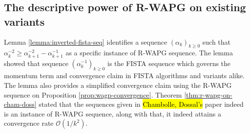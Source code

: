 \documentclass[12pt]{article}
\begin{document}
    \subsection{The descriptive power of R-WAPG on existing variants}\label{ssec:describe-variants-with-rwapg}
        Lemma \ref{lemma:inverted-fista-seq} identifies a sequence $(\alpha_k)_{k \ge 0}$ such that $\alpha_k^{-2} \ge \alpha_{k + 1}^{-2} - \alpha_{k + 1}^{-1}$ as a specific instance of R-WAPG sequence. 
        The lemma showed that sequence $(\alpha_k^{-1})_{k \ge 0}$ is the FISTA sequence which governs the momentum term and convergence claim in FISTA algorithms and variants alike. 
        The lemma also provides a simplified convergence claim using the R-WAPG sequence on Proposition \ref{prop:wagp-convergence}. 
        Theorem \ref{thm:r-wapg-on-cham-doss} stated that the sequences given in  
        {\hl{Chambolle, Dossal's}}
        paper \cite{chambolle_convergence_2015} indeed is an instance of R-WAPG sequence, along with that, it indeed attains a convergence rate $\mathcal O(1/k^2)$. 
        \par 
        
\end{document}
